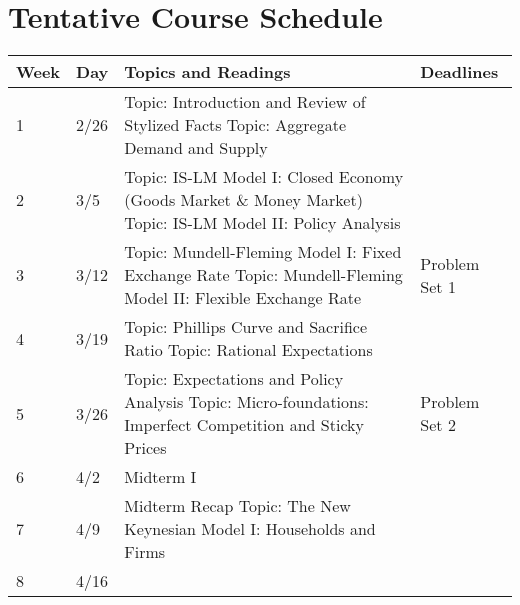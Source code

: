 \documentclass[12pt]{article}
\begin{document}
\section*{Tentative Course Schedule}

\newlength\bb
\setlength{}
\newlength\qq
\setlength{}
\newlength\rr
\setlength{}
\newlength\pp
\setlength{}
\begin{tabular}{|p{\bb}|p{\bb}|p{\pp}|p{\rr}|}
    \hline
        Week & Day & Topics and Readings & Deadlines \\
    \hline
    \hline
        1
        &
        2/26
        &
        Topic: Introduction and Review of Stylized Facts
        \newline
        Topic: Aggregate Demand and Supply
        &
    \\
    \hline
        2
        &
        3/5
        &
        Topic: IS-LM Model I: Closed Economy (Goods Market \& Money Market)
        \newline
        Topic: IS-LM Model II: Policy Analysis
        &
    \\
    \hline

 3
        &
        3/12
        &
        Topic: Mundell-Fleming Model I: Fixed Exchange Rate
        \newline
        Topic: Mundell-Fleming Model II: Flexible Exchange Rate
        &
        Problem Set 1
    \\
    \hline
        4
        &

   3/19
        &
        Topic: Phillips Curve and Sacrifice Ratio
        \newline
        Topic: Rational Expectations
        &
    \\
    \hline
        5
        &
        3/26
        &
        Topic: Expectations and Policy Analysis
     \newline
        Topic: Micro-foundations: Imperfect Competition and Sticky Prices
        &
        Problem Set 2
    \\
    \hline
        6
        &
        4/2
        &
        Midterm I
        &
    \\
    \hline

     7
        &
        4/9
        &
        Midterm Recap
        \newline
        Topic: The New Keynesian Model I: Households and Firms
        &
    \\
    \hline
        8
        &
        4/16


\end{tabular}
\end{document}
